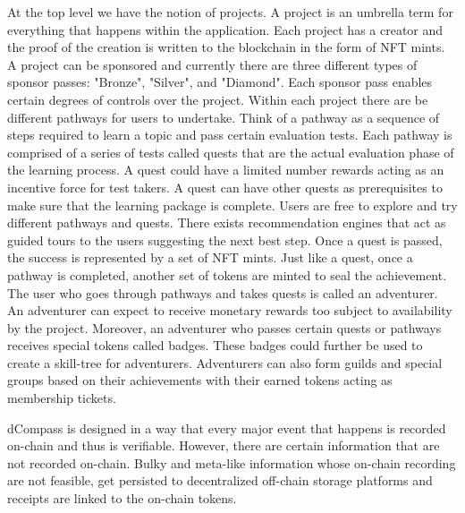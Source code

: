 \documentclass[12pt, a4paper]{article}
\begin{document}
At the top level we have the notion of projects. A project is an umbrella term for everything that happens within the application. Each project has a creator and the proof of the creation is written to the blockchain in the form of NFT mints. A project can be sponsored and currently there are three different types of sponsor passes: "Bronze", "Silver", and "Diamond". Each sponsor pass enables certain degrees of controls over the project. Within each project there are be different pathways for users to undertake. Think of a pathway as a sequence of steps required to learn a topic and pass certain evaluation tests. Each pathway is comprised of a series of tests called quests that are the actual evaluation phase of the learning process. A quest could have a limited number rewards acting as an incentive force for test takers. A quest can have other quests as prerequisites to make sure that the learning package is complete. Users are free to explore and try different pathways and quests. There exists recommendation engines that act as guided tours to the users suggesting the next best step. Once a quest is passed, the success is represented by a set of NFT mints. Just like a quest, once a pathway is completed, another set of tokens are minted to seal the achievement. The user who goes through pathways and takes quests is called an adventurer. An adventurer can expect to receive monetary rewards too subject to availability by the project. Moreover, an adventurer who passes certain quests or pathways receives special tokens called badges. These badges could further be used to create a skill-tree for adventurers. Adventurers can also form guilds and special groups based on their achievements with their earned tokens acting as membership tickets.

dCompass is designed in a way that every major event that happens is recorded on-chain and thus is verifiable. However, there are certain information that are not recorded on-chain. Bulky and meta-like information whose on-chain recording are not feasible, get persisted to decentralized off-chain storage platforms and receipts are linked to the on-chain tokens.
\end{document}
